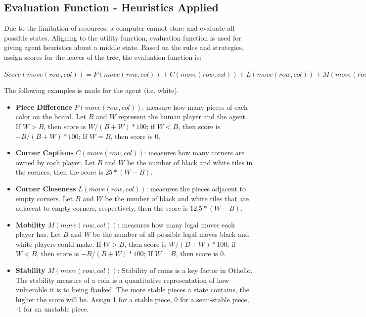 \documentclass[letterpaper,12pt]{article}
\begin{document}
\subsection{Evaluation Function - Heuristics Applied}

Due to the limitation of resources, a computer cannot store and evaluate all possible states. Aligning to the utility function, evaluation function is used for giving agent heuristics about a middle state. Based on the rules and strategies, assign scores for the leaves of the tree, the evaluation function is:

\begin{center}
$Score(move(row, col)) = P(move(row, col)) + C(move(row, col)) + L(move(row, col)) + M(move(row, col)) + S(move(row, col))$
\end{center}
\noindent
The following examples is made for the agent (i.e. white).

\begin{itemize}
\item \textbf{Piece Difference} $P(move(row, col))$: measure how many pieces of each color on the board. Let $B$ and $W$ represent the human player and the agent. If $W > B$, then score is $W/(B+W) * 100$; if $W < B$, then score is $-B/(B+W) * 100$; If $W = B$, then score is 0.
\item \textbf{Corner Captions} $C(move(row, col))$: measures how many corners are owned by each player. Let $B$ and $W$ be the number of black and white tiles in the corners, then the score is $25*(W - B)$.
\item \textbf{Corner Closeness} $L(move(row, col))$: measures the pieces adjacent to empty corners. Let $B$ and $W$ be the number of black and white tiles that are adjacent to empty corners, respectively, then the score is $12.5*(W - B)$.
\item \textbf{Mobility} $M(move(row, col))$: measures how many legal moves each player has. Let $B$ and $W$ be the number of all possible legal moves black and white players could make. If $W > B$, then score is $W/(B+W) * 100$; if $W < B$, then score is $-B/(B+W) * 100$; If $W = B$, then score is 0.
\item \textbf{Stability} $M(move(row, col))$: Stability of coins is a key factor in Othello. The stability measure of a coin is a quantitative representation of how vulnerable it is to being flanked. The more stable pieces a state contains, the higher the score will be. Assign 1 for a stable piece, 0 for a semi-stable piece, -1 for an unstable piece.
\end{itemize}
\end{document}
